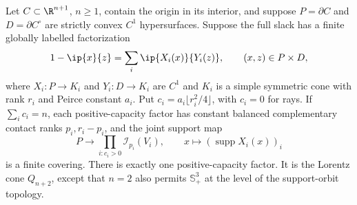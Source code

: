 \begin{theorem}\label{thm:global-saturation}
Let $C\subset\R^{n+1}$, $n\geq1$, contain the origin in its interior,
and suppose $P=\partial C$ and $D=\partial C^\circ$ are strictly convex
$C^1$ hypersurfaces. Suppose the full slack has a finite globally labelled
factorization
\[
 1-\ip{x}{z}=\sum_i\ip{X_i(x)}{Y_i(z)},\qquad (x,z)\in P\times D,
\]
where $X_i:P\to K_i$ and $Y_i:D\to K_i$ are $C^1$ and $K_i$ is a simple
symmetric cone with rank $r_i$ and Peirce constant $a_i$. Put
$c_i=a_i\lfloor r_i^2/4\rfloor$, with $c_i=0$ for rays.
If $\sum_i c_i=n$, each positive-capacity factor has constant balanced
complementary contact ranks $p_i,r_i-p_i$, and the joint support map
\[
 P\longrightarrow\prod_{i:c_i>0}\mathcal I_{p_i}(V_i),
 \qquad x\longmapsto(\operatorname{supp}X_i(x))_i
\]
is a finite covering. There is exactly one positive-capacity factor.
It is the Lorentz cone $Q_{n+2}$, except that $n=2$ also permits
$\mathbb S_+^3$ at the level of the support-orbit topology.
\end{theorem}
